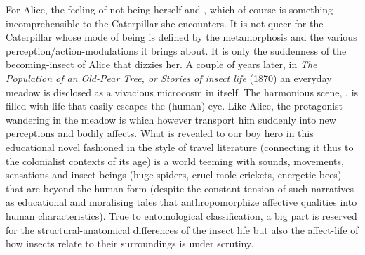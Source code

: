 {For Alice, the feeling of not being herself and , which of course is something
incomprehensible to the Caterpillar she encounters. It is not queer for
the Caterpillar whose mode of being is defined by the metamorphosis and
the various perception/action{}-modulations it brings about. It is only
the suddenness of the becoming{}-insect of Alice that dizzies her. A
couple of years later, in {\em The Population of an Old{}-Pear Tree,
or Stories of insect life} (1870) an everyday meadow is disclosed as a
vivacious microcosm in itself. The harmonious scene, , is filled with life that easily escapes the (human)
eye. Like Alice, the protagonist wandering in the meadow is  which however transport him suddenly
into new perceptions and bodily affects. What is revealed to our boy
hero in this educational novel fashioned in the style of travel
literature (connecting it thus to the colonialist contexts of its age)
is a world teeming with sounds, movements, sensations and insect beings
(huge spiders, cruel mole{}-crickets, energetic bees) that are beyond
the human form (despite the constant tension of such narratives as
educational and moralising tales that anthropomorphize affective
qualities into human characteristics). True to entomological
classification, a big part is reserved for the structural{}-anatomical
differences of the insect life but also the affect{}-life of how
insects relate to their surroundings is under scrutiny. 

}
